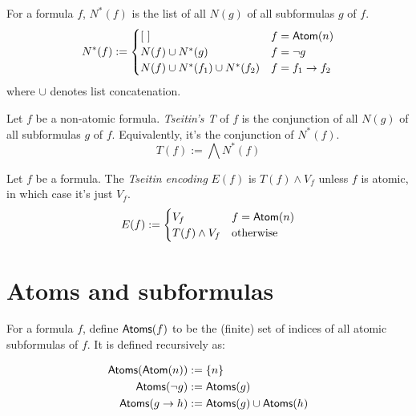 \begin{definition}
    \label{Tseitin.Ns}
    \leanok
    For a formula $f$, $N^*(f)$ is the list of all $N(g)$ of all subformulas $g$ of $f$.
    \[
    N^*(f) :=
    \begin{cases}
        [\ ] & f = \mathsf{Atom}(n) \\
        N(f) \cup N^*(g) & f = \neg g \\
        N(f) \cup N^*(f_1) \cup N^*(f_2) & f = f_1 \to f_2
    \end{cases}
    \]
    where $\cup$ denotes list concatenation.
\end{definition}

\begin{definition}
    \label{Tseitin.T}
    \leanok
    Let $f$ be a non-atomic formula.
    \emph{Tseitin's T} of $f$ is the conjunction of all $N(g)$ of all subformulas $g$ of $f$.
    Equivalently, it's the conjunction of $N^*(f)$.
    \[
    T(f) := \bigwedge N^*(f)
    \]
\end{definition}

\begin{definition}
    \label{Tseitin.E}
    \leanok
    Let $f$ be a formula.
    The \emph{Tseitin encoding} $E(f)$ is $T(f) \land V_f$ unless $f$ is atomic, in which case it's just $V_f$.
    \[
    E(f) := \begin{cases}
        V_f & f = \mathsf{Atom}(n) \\
        T(f) \wedge V_f & \text{otherwise}\\
    \end{cases}
    \]
\end{definition}

\section{Atoms and subformulas}

\begin{definition}
    \label{Atoms}
    \leanok
    For a formula $f$, define $\mathsf{Atoms}(f)$ to be the (finite) set of indices of all atomic subformulas of $f$.
    It is defined recursively as:

    \[
    \begin{aligned}
        \mathsf{Atoms}(\mathsf{Atom}(n)) &:= \{n\} \\
        \mathsf{Atoms}(\neg g) &:= \mathsf{Atoms}(g) \\
        \mathsf{Atoms}(g \to h) &:= \mathsf{Atoms}(g) \cup \mathsf{Atoms}(h) \\
    \end{aligned}
    \]
\end{definition}

